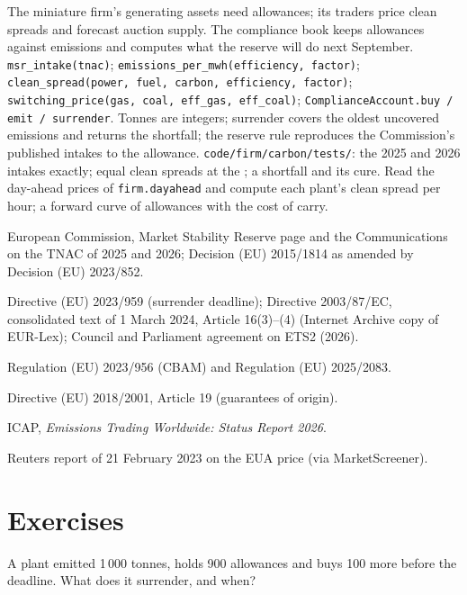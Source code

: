 \begin{build}
 The miniature firm's generating assets need allowances; its traders price clean
spreads and forecast auction supply. The compliance book keeps allowances against emissions and
computes what the reserve will do next September.
 \texttt{msr\_intake(tnac)}; \texttt{emissions\_per\_mwh(efficiency, factor)};
\texttt{clean\_spread(power, fuel, carbon, efficiency, factor)}; \texttt{switching\_price(gas, coal,
eff\_gas, eff\_coal)}; \texttt{ComplianceAccount.buy / emit / surrender}.
 Tonnes are integers; surrender covers the oldest uncovered emissions and returns the
shortfall; the reserve rule reproduces the Commission's published intakes to the allowance.
 \texttt{code/firm/carbon/tests/}: the 2025 and 2026 intakes exactly; equal
clean spreads at the ; a shortfall and its cure.
 Read the day-ahead prices of \texttt{firm.dayahead} and compute each plant's clean
spread per hour; a forward curve of allowances with the cost of carry.
\end{build}

\begin{omsources}
\item European Commission, Market Stability Reserve page and the Communications on the TNAC of 2025
and 2026; Decision (EU) 2015/1814 as amended by Decision (EU) 2023/852.
\item Directive (EU) 2023/959 (surrender deadline); Directive 2003/87/EC, consolidated text of 1 March 2024, Article 16(3)--(4)
(Internet Archive copy of EUR-Lex); Council and Parliament agreement on ETS2 (2026).
\item Regulation (EU) 2023/956 (CBAM) and Regulation (EU) 2025/2083.
\item Directive (EU) 2018/2001, Article 19 (guarantees of origin).
\item ICAP, \emph{Emissions Trading Worldwide: Status Report 2026}.
\item Reuters report of 21 February 2023 on the EUA price (via MarketScreener).
\end{omsources}

\section{Exercises}

\begin{exercise}[$\star$]\label{exo:m3:emissions-and-environmental-markets:1}
A plant emitted 1\,000 tonnes, holds 900 allowances and buys 100 more before the deadline. What
does it surrender, and when?
\end{exercise}

